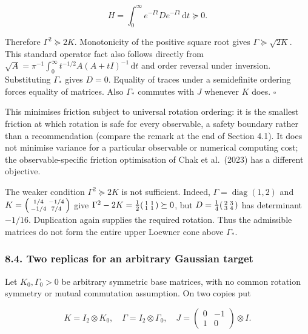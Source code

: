 \documentclass[
  british,
  11pt,
  a4paper,
]{article}
\begin{document}
\[
H=\int_0^\infty e^{-\Gamma t}D e^{-\Gamma t}\,\mathrm dt\succeq0. \tag{M7}
\]

Therefore \(\Gamma^2\succeq2K\). Monotonicity of the positive square
root gives \(\Gamma\succeq\sqrt{2K}\). This standard operator fact also
follows directly from
\(\sqrt A=\pi^{-1}\int_0^\infty t^{-1/2}A(A+tI)^{-1}\,\mathrm dt\) and
order reversal under inversion. Substituting \(\Gamma_*\) gives \(D=0\).
Equality of traces under a semidefinite ordering forces equality of
matrices. Also \(\Gamma_*\) commutes with \(J\) whenever \(K\) does.
\(\square\)

This minimises friction subject to universal rotation ordering: it is
the smallest friction at which rotation is safe for every observable, a
safety boundary rather than a recommendation (compare the remark at the
end of Section 4.1). It does not minimise variance for a particular
observable or numerical computing cost; the observable-specific friction
optimisation of Chak et al.~(2023) has a different objective.

The weaker condition \(\Gamma^2\succeq2K\) is not sufficient. Indeed,
\(\Gamma=\mathop{\mathrm{diag}}(1,2)\) and
\(K=\begin{psmallmatrix}1/4&-1/4\\-1/4&7/4\end{psmallmatrix}\) give
\(\Gamma^2-2K=\tfrac12\begin{psmallmatrix}1&1\\1&1\end{psmallmatrix}\succeq0\),
but \(D=\tfrac14\begin{psmallmatrix}2&3\\3&4\end{psmallmatrix}\) has
determinant \(-1/16\). Duplication again supplies the required rotation.
Thus the admissible matrices do not form the entire upper Loewner cone
above \(\Gamma_*\).

\subsubsection{8.4. Two replicas for an arbitrary Gaussian
target}\label{two-replicas-for-an-arbitrary-gaussian-target}

Let \(K_0,\Gamma_0>0\) be arbitrary symmetric base matrices, with no
common rotation symmetry or mutual commutation assumption. On two copies
put

\[
K=I_2\otimes K_0,\quad \Gamma=I_2\otimes\Gamma_0,\quad
J=\begin{pmatrix}0&-1\\1&0\end{pmatrix}\otimes I. \tag{M8}
\]
\end{document}
